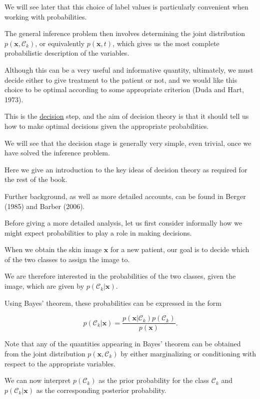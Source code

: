 \documentclass{article}
\begin{document}
We will see later that this choice of label values is particularly convenient when working with probabilities. 

The general inference problem then involves determining the joint distribution $p(\mathbf{x}, \mathcal{C}_{k})$, or equivalently $p(\mathbf{x}, t)$, which gives us the most complete probabilistic description of the variables. 

Although this can be a very useful and informative quantity, ultimately, we must decide either to give treatment to the patient or not, and we would like this choice to be optimal according to some appropriate criterion (Duda and Hart, 1973). 

This is the \underline{\color{red}decision} step, and the aim of decision theory is that it should tell us how to make optimal decisions given the appropriate probabilities. 

We will see that the decision stage is generally very simple, even trivial, once we have solved the inference problem. 

Here we give an introduction to the key ideas of decision theory as required for the rest of the book. 

Further background, as well as more detailed accounts, can be found in Berger (1985) and Barber (2006).

Before giving a more detailed analysis, let us first consider informally how we might expect probabilities to play a role in making decisions. 

When we obtain the skin image $\mathbf{x}$ for a new patient, our goal is to decide which of the two classes to assign the image to. 

We are therefore interested in the probabilities of the two classes, given the image, which are given by $p(\mathcal{C}_{k}|\mathbf{x})$. 

Using Bayes' theorem, these probabilities can be expressed in the form

\begin{equation}
p(\mathcal{C}_{k}|\mathbf{x}) = \frac{p(\mathbf{x}|\mathcal{C}_{k})p(\mathcal{C}_{k})}{p(\mathbf{x})}.
\tag{5.19}
\end{equation}

Note that any of the quantities appearing in Bayes' theorem can be obtained from the joint distribution $p(\mathbf{x}, \mathcal{C}_{k})$ by either marginalizing or conditioning with respect to the appropriate variables. 

We can now interpret $p(\mathcal{C}_{k})$ as the prior probability for the class $\mathcal{C}_{k}$ and $p(\mathcal{C}_{k}|\mathbf{x})$ as the corresponding posterior probability. 
\end{document}
